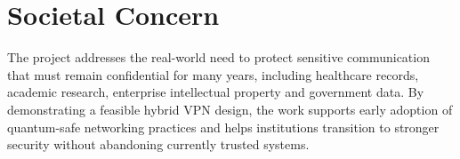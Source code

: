 \section{Societal Concern}
The project addresses the real-world need to protect sensitive communication
that must remain confidential for many years, including healthcare records,
academic research, enterprise intellectual property and government data. By
demonstrating a feasible hybrid VPN design, the work supports early adoption of
quantum-safe networking practices and helps institutions transition to stronger
security without abandoning currently trusted systems.
